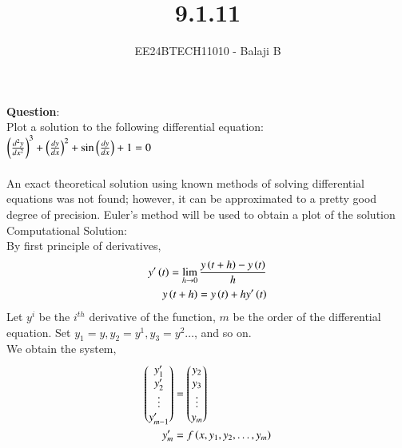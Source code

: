\documentclass[journal]{IEEEtran}
\begin{document}

\vspace{3cm}

\title{9.1.11}
\author{EE24BTECH11010 - Balaji B}
 \maketitle
{\let\newpage\relax\maketitle}

\renewcommand{\thefigure}{\theenumi}
\renewcommand{\thetable}{\theenumi}
\setlength{\intextsep}{10pt} %


\renewcommand{\thetable}{\theenumi}

\textbf{Question}:\\
Plot a solution to the following differential equation: $\left(\frac{d^2y}{dx^2}\right)^3 + \left(\frac{dy}{dx}\right)^2 + \sin{\ensuremath{\left(\frac{dy}{dx}\right)}} + 1 = 0$
\\ \\
\solution
An exact theoretical solution using known methods of solving differential equations was not found; however, it can be approximated to a pretty good degree of precision. Euler's method will be used to obtain a plot of the solution\\
Computational Solution:\\
By first principle of derivatives,
\begin{align}
    y^{\prime}\left(t\right) = \lim_{h\to 0}\frac{y\left(t+h\right) - y\left(t\right)}{h}\\
    y\left(t+h\right) = y\left(t\right) + hy^{\prime}\left(t\right)
\end{align}
Let $y^{i}$ be the $i^{th}$ derivative of the function, $m$ be the order of the differential equation. Set $y_1=y, y_2=y^{1}, y_3=y^{2} \dots$, and so on.\\
We obtain the system,
\begin{align}
    \begin{pmatrix}y_1^{\prime} \\ y_2^{\prime} \\ \vdots \\ y_{m-1}^{\prime} \end{pmatrix}&=\begin{pmatrix}y_2 \\ y_3 \\ \vdots \\ y_m\end{pmatrix}\\
y_m^{\prime}&=f\left(x, y_1, y_2, \dots, y_m\right)
\end{align}
\end{document}
